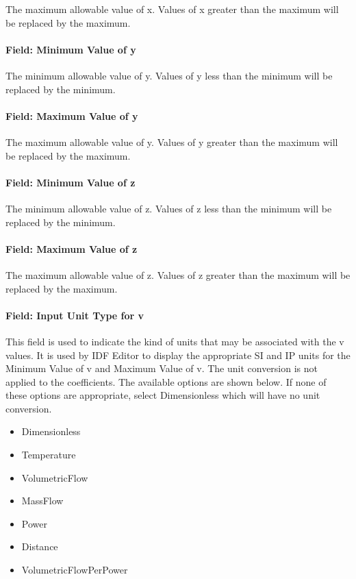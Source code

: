 The maximum allowable value of x. Values of x greater than the maximum will be replaced by the maximum.

\paragraph{Field: Minimum Value of y}\label{field-minimum-value-of-y-7}

The minimum allowable value of y. Values of y less than the minimum will be replaced by the minimum.

\paragraph{Field: Maximum Value of y}\label{field-maximum-value-of-y-7}

The maximum allowable value of y. Values of y greater than the maximum will be replaced by the maximum.

\paragraph{Field: Minimum Value of z}\label{field-minimum-value-of-z-3}

The minimum allowable value of z. Values of z less than the minimum will be replaced by the minimum.

\paragraph{Field: Maximum Value of z}\label{field-maximum-value-of-z-3}

The maximum allowable value of z. Values of z greater than the maximum will be replaced by the maximum.

\paragraph{Field: Input Unit Type for v}\label{field-input-unit-type-for-v}

This field is used to indicate the kind of units that may be associated with the v values. It is used by IDF Editor to display the appropriate SI and IP units for the Minimum Value of v and Maximum Value of v. The unit conversion is not applied to the coefficients. The available options are shown below. If none of these options are appropriate, select Dimensionless which will have no unit conversion.

\begin{itemize}
\item
  Dimensionless
\item
  Temperature
\item
  VolumetricFlow
\item
  MassFlow
\item
  Power
\item
  Distance
\item
  VolumetricFlowPerPower
\end{itemize}

